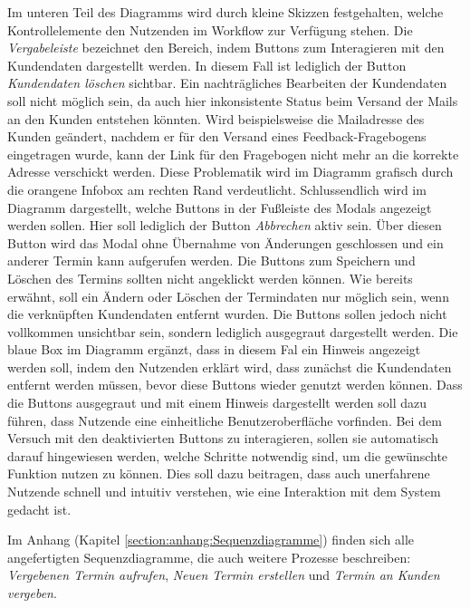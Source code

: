 Im unteren Teil des Diagramms wird durch kleine Skizzen festgehalten, welche
Kontrollelemente den Nutzenden im Workflow zur Verfügung stehen. Die
\textit{Vergabeleiste} bezeichnet den Bereich, indem Buttons zum Interagieren
mit den Kundendaten dargestellt werden. In diesem Fall ist lediglich der Button
\textit{Kundendaten löschen} sichtbar. Ein nachträgliches Bearbeiten der
Kundendaten soll nicht möglich sein, da auch hier inkonsistente Status beim
Versand der Mails an den Kunden entstehen könnten. Wird beispielsweise die
Mailadresse des Kunden geändert, nachdem er für den Versand eines
Feedback-Fragebogens eingetragen wurde, kann der Link für den Fragebogen nicht
mehr an die korrekte Adresse verschickt werden. Diese Problematik wird im
Diagramm grafisch durch die orangene Infobox am rechten Rand verdeutlicht.
Schlussendlich wird im Diagramm dargestellt, welche Buttons in der Fußleiste
des Modals angezeigt werden sollen. Hier soll lediglich der Button
\textit{Abbrechen} aktiv sein. Über diesen Button wird das Modal ohne Übernahme
von Änderungen geschlossen und ein anderer Termin kann aufgerufen werden. Die
Buttons zum Speichern und Löschen des Termins sollten nicht angeklickt werden
können. Wie bereits erwähnt, soll ein Ändern oder Löschen der Termindaten nur
möglich sein, wenn die verknüpften Kundendaten entfernt wurden. Die Buttons
sollen jedoch nicht vollkommen unsichtbar sein, sondern lediglich ausgegraut
dargestellt werden. Die blaue Box im Diagramm ergänzt, dass in diesem Fal ein
Hinweis angezeigt werden soll, indem den Nutzenden erklärt wird, dass zunächst
die Kundendaten entfernt werden müssen, bevor diese Buttons wieder genutzt
werden können. Dass die Buttons ausgegraut und mit einem Hinweis dargestellt
werden soll dazu führen, dass Nutzende eine einheitliche Benutzeroberfläche
vorfinden. Bei dem Versuch mit den deaktivierten Buttons zu interagieren,
sollen sie automatisch darauf hingewiesen werden, welche Schritte notwendig
sind, um die gewünschte Funktion nutzen zu können. Dies soll dazu beitragen,
dass auch unerfahrene Nutzende schnell und intuitiv verstehen, wie eine
Interaktion mit dem System gedacht ist.

Im Anhang (Kapitel \ref{section:anhang:Sequenzdiagramme}) finden sich alle angefertigten Sequenzdiagramme, die auch weitere Prozesse beschreiben: \textit{Vergebenen
    Termin aufrufen}, \textit{Neuen Termin erstellen} und \textit{Termin an Kunden
    vergeben}.

